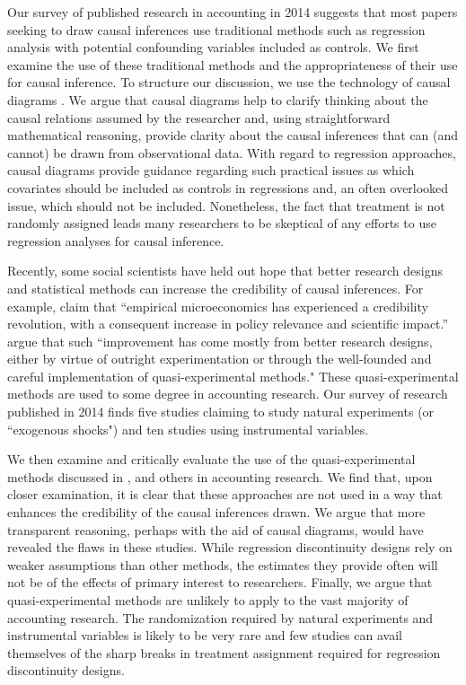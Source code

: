 \documentclass[11pt,reqno]{amsart}
\begin{document}
Our survey of published research in accounting in 2014 suggests that most papers seeking to draw causal inferences use traditional methods such as regression analysis with potential confounding variables included as controls.
We first examine the use of these traditional methods and the appropriateness of their use for causal inference.
To structure our discussion, we use the technology of causal diagrams \citep{Pearl:2009kh}.
We argue that causal diagrams help to clarify thinking about the causal relations assumed by the researcher and, using straightforward mathematical reasoning, provide clarity about the causal inferences that can (and cannot) be drawn from observational data.
With regard to regression approaches, causal diagrams provide guidance regarding such practical issues as which covariates should be included as controls in regressions and, an often overlooked issue, which should not be included.
Nonetheless, the fact that treatment is not randomly assigned leads many researchers to be skeptical of any efforts to use regression analyses for causal inference.

Recently, some social scientists have held out hope that better research designs and statistical methods can increase the credibility of causal inferences.
For example, \citet{Angrist:2010jv} claim that ``empirical microeconomics has experienced a credibility revolution, with a consequent increase in policy relevance and scientific impact.''  
\citet[p. 26]{Angrist:2010jv} argue that such ``improvement has come mostly from better research designs, either by virtue of outright experimentation or through the well-founded and careful implementation of quasi-experimental methods."
These quasi-experimental methods are used to some degree in accounting research. 
Our survey of research published in 2014 finds five studies claiming to study natural experiments (or ``exogenous shocks") and ten studies using instrumental variables.

We then examine and critically evaluate the use of the quasi-experimental methods discussed in \citet{Angrist:2010jv}, \citet{Roberts:2013cz} and others in accounting research.
We find that, upon closer examination, it is clear that these approaches are not used in a way that enhances the credibility of the causal inferences drawn.
We argue that more transparent reasoning, perhaps with the aid of causal diagrams, would have revealed the flaws in these studies.
While regression discontinuity designs rely on weaker assumptions than other methods, the estimates they provide often will not be of the effects of primary interest to researchers.
Finally, we argue that quasi-experimental methods are unlikely to apply to the vast majority of accounting research.
The randomization required by natural experiments and instrumental variables is likely to be very rare and few studies can avail themselves of the sharp breaks in treatment assignment required for regression discontinuity designs.
\end{document}
